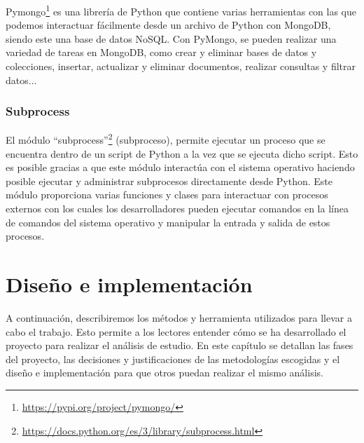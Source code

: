 \documentclass[a4paper, 12pt]{book}
\begin{document}
Pymongo\footnote{\url{https://pypi.org/project/pymongo/}} es una librería de Python que contiene varias herramientas con las que podemos interactuar fácilmente desde un archivo de Python con MongoDB, siendo este una base de datos NoSQL. 
Con PyMongo, se pueden realizar una variedad de tareas en MongoDB, como crear y eliminar bases de datos y colecciones, insertar, actualizar y eliminar documentos, realizar consultas y filtrar datos...


\subsection{Subprocess} %
\label{sec:subprocess} %
El módulo ``subprocess''\footnote{\url{https://docs.python.org/es/3/library/subprocess.html}} (subproceso), permite ejecutar un proceso que se encuentra dentro de un script de Python a la vez que se ejecuta dicho script.
Esto es posible gracias a que este módulo interactúa con el sistema operativo haciendo posible ejecutar y administrar subprocesos directamente desde Python. 
Este módulo proporciona varias funciones y clases para interactuar con procesos externos con los cuales los desarrolladores pueden ejecutar comandos en la línea de comandos del sistema operativo y manipular la entrada y salida de estos procesos.



\cleardoublepage
\chapter{Diseño e implementación}
\label{chap:diseño}

A continuación, describiremos los métodos y herramienta utilizados para llevar a cabo el trabajo. 
Esto permite a los lectores entender cómo se ha desarrollado el proyecto para realizar el análisis de estudio.
En este capítulo se detallan las fases del proyecto, las decisiones y justificaciones de las metodologías escogidas y el diseño e implementación para que otros puedan realizar el mismo análisis.
\end{document}

